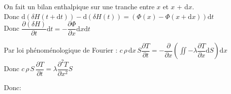 \documentclass[a4paper]{article}
\begin{document}
\pagestyle{fancy}
\fancyhf{}
\setlength{\headheight}{15pt}

\begin{center}
	\large{}
\end{center}


\begin{center}
\end{center}

On fait un bilan enthalpique sur une tranche entre $x$ et $x$ + d$x$.
\\Donc \(\mathrm{d}(\delta H(t + \mathrm{d}t)) - \mathrm{d} (\delta H (t)) = (\Phi(x) -\Phi(x +\mathrm{d}x)) \mathrm{d}t\) \\
Donc \(
\dfrac{\partial (\delta H) }{\partial t} \mathrm{d}t = - \dfrac{\partial \Phi}{\partial x} \mathrm{d}x \mathrm{d}t \)

Par loi phénoménologique de Fourier : \(c\, \rho\, \mathrm{d}x\, S \dfrac{\partial T}{\partial t} = - \dfrac{\partial }{\partial x} \left(\displaystyle\iint - \lambda \dfrac{\partial T }{\partial x} \mathrm{d}S \right)\mathrm{d}x\)\\
Donc \(c\, \rho\, S\, \dfrac{\partial T}{\partial t} = \lambda \dfrac{\partial^2 T }{\partial x^2} S\)

Donc:
\begin{center}
\end{center}
\end{document}
